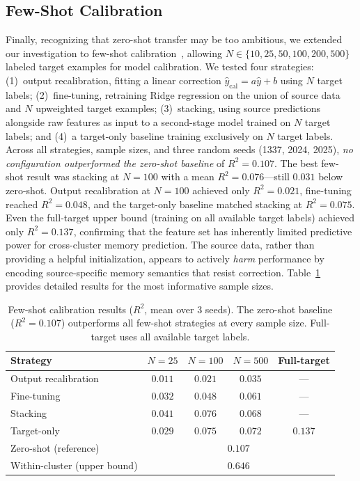 \documentclass[sigconf]{acmart}
\begin{document}
\subsection{Few-Shot Calibration}

Finally, recognizing that zero-shot transfer may be too ambitious, we extended our investigation to few-shot calibration~\cite{few_shot_survey_2020}, allowing $N \in \{10, 25, 50, 100, 200, 500\}$ labeled target examples for model calibration.
We tested four strategies: (1)~output recalibration, fitting a linear correction $\hat{y}_{\text{cal}} = a\hat{y} + b$ using $N$ target labels; (2)~fine-tuning, retraining Ridge regression on the union of source data and $N$ upweighted target examples; (3)~stacking, using source predictions alongside raw features as input to a second-stage model trained on $N$ target labels; and (4)~a target-only baseline training exclusively on $N$ target labels.
Across all strategies, sample sizes, and three random seeds (1337, 2024, 2025), \emph{no configuration outperformed the zero-shot baseline} of $R^2 = 0.107$.
The best few-shot result was stacking at $N = 100$ with a mean $R^2 = 0.076$---still $0.031$ below zero-shot.
Output recalibration at $N = 100$ achieved only $R^2 = 0.021$, fine-tuning reached $R^2 = 0.048$, and the target-only baseline matched stacking at $R^2 = 0.075$.
Even the full-target upper bound (training on all available target labels) achieved only $R^2 = 0.137$, confirming that the feature set has inherently limited predictive power for cross-cluster memory prediction.
The source data, rather than providing a helpful initialization, appears to actively \emph{harm} performance by encoding source-specific memory semantics that resist correction.
Table~\ref{tab:fewshot} provides detailed results for the most informative sample sizes.

\begin{table}[t]
\caption{Few-shot calibration results ($R^2$, mean over 3 seeds). The zero-shot baseline ($R^2 = 0.107$) outperforms all few-shot strategies at every sample size. Full-target uses all available target labels.}
\label{tab:fewshot}
\centering
\small
\begin{tabular}{@{}lcccc@{}}
\toprule
\textbf{Strategy} & $N{=}25$ & $N{=}100$ & $N{=}500$ & \textbf{Full-target} \\
\midrule
Output recalibration & $0.011$ & $0.021$ & $0.035$ & --- \\
Fine-tuning & $0.032$ & $0.048$ & $0.061$ & --- \\
Stacking & $0.041$ & $0.076$ & $0.068$ & --- \\
Target-only & $0.029$ & $0.075$ & $0.072$ & $0.137$ \\
\midrule
Zero-shot (reference) & \multicolumn{4}{c}{$0.107$} \\
Within-cluster (upper bound) & \multicolumn{4}{c}{$0.646$} \\
\bottomrule
\end{tabular}
\end{table}
\end{document}
